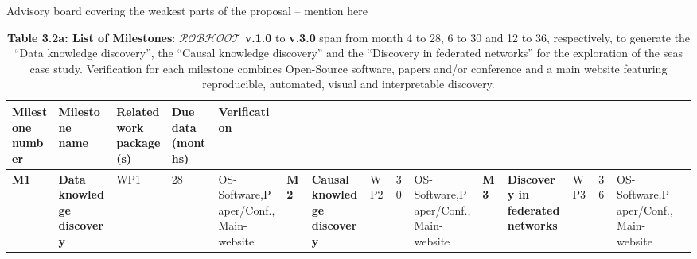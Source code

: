 \documentclass[11pt, a4paper]{article} %
\begin{document}
Advisory board covering the weakest parts of the proposal -- mention here

\begin{table}[h!]
\begin{center}
  \begin{tabular}{|m{1.75cm} || m{2.5cm} || m{2.5cm} || m{2.4cm} || m{6cm}|}
   \hline\hline
   \hline\hline
  {\bf Milestone number} & {\bf Milestone name} & {\bf Related work package(s)} & {\bf Due data (months)} & {\bf Verification} \\
   \hline\hline
  {\bf M1} & {\bf Data knowledge discovery} & WP1 & 28 & OS-Software,Paper/Conf.,Main-website &
  \hline\hline
  {\bf M2} & {\bf Causal knowledge discovery}  & WP2 & 30 & OS-Software,Paper/Conf.,Main-website &
  \hline\hline
  {\bf M3} & {\bf Discovery in federated networks} & WP3 & 36 & OS-Software,Paper/Conf.,Main-website &
  \hline\hline
\hline\hline
  \end{tabular}
\end{center}
\caption*{{{\bf Table 3.2a: List of Milestones}: {\bf
      $\mathcal{ROBHOOT}$ v.1.0} to {\bf v.3.0} span from month 4 to
    28, 6 to 30 and 12 to 36, respectively, to generate the ``Data
    knowledge discovery'', the ``Causal knowledge discovery'' and the
    ``Discovery in federated networks'' for the exploration of the
    seas case study. Verification for each milestone combines
    Open-Source software, papers and/or conference and a main website
    featuring reproducible, automated, visual and interpretable
    discovery.}}
\end{table}
\end{document}
